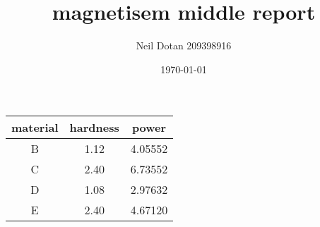 \documentclass{article}
\begin{document}
\title{magnetisem middle report}
\author{Neil Dotan 209398916}
\date{\today}
\maketitle
\section{}
\begin{tabular}{ccc}
    \toprule
    material & hardness & power   \\
    \midrule
    B        & 1.12     & 4.05552 \\
    C        & 2.40     & 6.73552 \\
    D        & 1.08     & 2.97632 \\
    E        & 2.40     & 4.67120 \\
    \bottomrule
\end{tabular}
\end{document}
